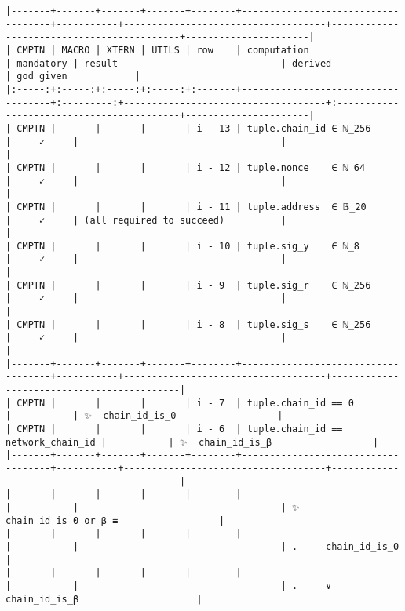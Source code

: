 \documentclass[varwidth=\maxdimen,margin=0.5cm,multi={verbatim}]{standalone}
\begin{document}
\begin{verbatim}
|-------+-------+-------+-------+--------+------------------------------------+-----------+------------------------------------+-------------------------------------------+----------------------|
| CMPTN | MACRO | XTERN | UTILS | row    | computation                        | mandatory | result                             | derived                                   | god given            |
|:-----:+:-----:+:-----:+:-----:+:-------+------------------------------------+:---------:+------------------------------------+:------------------------------------------+----------------------|
| CMPTN |       |       |       | i - 13 | tuple.chain_id ∈ ℕ_256             |     ✓     |                                    |                                           |
| CMPTN |       |       |       | i - 12 | tuple.nonce    ∈ ℕ_64              |     ✓     |                                    |                                           |
| CMPTN |       |       |       | i - 11 | tuple.address  ∈ 𝔹_20              |     ✓     | (all required to succeed)          |                                           |
| CMPTN |       |       |       | i - 10 | tuple.sig_y    ∈ ℕ_8               |     ✓     |                                    |                                           |
| CMPTN |       |       |       | i - 9  | tuple.sig_r    ∈ ℕ_256             |     ✓     |                                    |                                           |
| CMPTN |       |       |       | i - 8  | tuple.sig_s    ∈ ℕ_256             |     ✓     |                                    |                                           |
|-------+-------+-------+-------+--------+------------------------------------+-----------+------------------------------------+-------------------------------------------|
| CMPTN |       |       |       | i - 7  | tuple.chain_id == 0                |           | ✨  chain_id_is_0                  |
| CMPTN |       |       |       | i - 6  | tuple.chain_id == network_chain_id |           | ✨  chain_id_is_β                  |
|-------+-------+-------+-------+--------+------------------------------------+-----------+------------------------------------+-------------------------------------------|
|       |       |       |       |        |                                    |           |                                    | ✨  chain_id_is_0_or_β ≡                  |
|       |       |       |       |        |                                    |           |                                    | .     chain_id_is_0                       |
|       |       |       |       |        |                                    |           |                                    | .     ∨ chain_id_is_β                     |

\end{verbatim}
\end{document}
